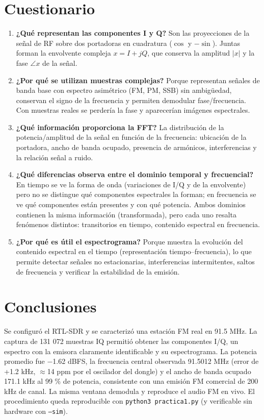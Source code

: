 \documentclass[11pt,a4paper]{article}
\begin{document}
\section{Cuestionario}

\begin{enumerate}
  \item \textbf{¿Qué representan las componentes I y Q?} Son las proyecciones de la señal de RF sobre dos portadoras en cuadratura ($\cos$ y $-\sin$). Juntas forman la envolvente compleja $x = I + jQ$, que conserva la amplitud $|x|$ y la fase $\angle x$ de la señal.
  \item \textbf{¿Por qué se utilizan muestras complejas?} Porque representan señales de banda base con espectro asimétrico (FM, PM, SSB) sin ambigüedad, conservan el signo de la frecuencia y permiten demodular fase/frecuencia. Con muestras reales se perdería la fase y aparecerían imágenes espectrales.
  \item \textbf{¿Qué información proporciona la FFT?} La distribución de la potencia/amplitud de la señal en función de la frecuencia: ubicación de la portadora, ancho de banda ocupado, presencia de armónicos, interferencias y la relación señal a ruido.
  \item \textbf{¿Qué diferencias observa entre el dominio temporal y frecuencial?} En tiempo se ve la forma de onda (variaciones de I/Q y de la envolvente) pero no se distingue qué componentes espectrales la forman; en frecuencia se ve qué componentes están presentes y con qué potencia. Ambos dominios contienen la misma información (transformada), pero cada uno resalta fenómenos distintos: transitorios en tiempo, contenido espectral en frecuencia.
  \item \textbf{¿Por qué es útil el espectrograma?} Porque muestra la evolución del contenido espectral en el tiempo (representación tiempo--frecuencia), lo que permite detectar señales no estacionarias, interferencias intermitentes, saltos de frecuencia y verificar la estabilidad de la emisión.
\end{enumerate}

\section{Conclusiones}

Se configuró el RTL-SDR y se caracterizó una estación FM real en 91.5 MHz. La captura de 131 072 muestras IQ permitió obtener las componentes I/Q, un espectro con la emisora claramente identificable y su espectrograma. La potencia promedio fue $-$1.62 dBFS, la frecuencia central observada 91.5012 MHz (error de +1.2 kHz, $\approx$14 ppm por el oscilador del dongle) y el ancho de banda ocupado 171.1 kHz al 99 \% de potencia, consistente con una emisión FM comercial de 200 kHz de canal. La misma ventana demodula y reproduce el audio FM en vivo. El procedimiento queda reproducible con \texttt{python3 practica1.py} (y verificable sin hardware con \texttt{--sim}).
\end{document}
